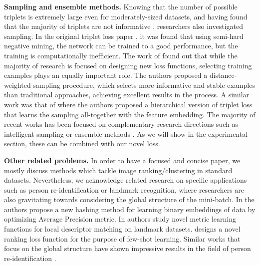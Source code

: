 \documentclass[runningheads]{llncs}
\begin{document}
\noindent\textbf{Sampling and ensemble methods.} Knowing that the number of possible triplets is extremely large even for moderately-sized datasets, and having found that the majority of triplets are not informative \cite{DBLP:conf/cvpr/SchroffKP15}, researchers also investigated sampling. In the original triplet loss paper \cite{DBLP:conf/cvpr/SchroffKP15}, it was found that using semi-hard negative mining, the network can be trained to a good performance, but the training is computationally inefficient. 
The work of \cite{DBLP:conf/iccv/ManmathaWSK17} found out that while the majority of research is focused on designing new loss functions, selecting training examples plays an equally important role. The authors proposed a distance-weighted sampling procedure, which selects more informative and stable examples than traditional approaches, achieving excellent results in the process. A similar work was that of \cite{DBLP:conf/eccv/GeHDS18} where the authors proposed a hierarchical version of triplet loss that learns the sampling all-together with the feature embedding. 
The majority of recent works has been focused on complementary research directions such as intelligent sampling \cite{DBLP:conf/iccv/ManmathaWSK17,DBLP:conf/eccv/GeHDS18,DDBLP:conf/cvpr/Duan2019,DDBLP:conf/cvpr/Wand2019,DDBLP:conf/cvpr/Xu2019} or ensemble methods \cite{DBLP:conf/eccv/XuanSP18,DDBLP:conf/cvpr/Sanakoyeu2019,DBLP:conf/eccv/KimGCLK18,DBLP:conf/iccv/OpitzWPB17,DBLP:conf/iccv/YuanYZ17}. As we will show in the experimental section, these can be combined with our novel loss.

\noindent\textbf{Other related problems.} In order to have a focused and concise paper, we mostly discuss methods which tackle image ranking/clustering in standard datasets. Nevertheless, we acknowledge related research on specific applications such as person re-identification or landmark recognition, where researchers are also gravitating towards considering the global structure of the mini-batch. In \cite{DBLP:conf/cvpr/0003CBS18} the authors propose a new hashing method for learning binary embeddings of data by optimizing Average Precision metric. In \cite{DBLP:journals/corr/abs-1906-07589,DBLP:conf/cvpr/0003LS18} authors study novel metric learning functions for local descriptor matching on landmark datasets. \cite{DBLP:conf/cvpr/Cakir0XKS19} designs a novel ranking loss function for the purpose of few-shot learning. Similar works that focus on the global structure have shown impressive results in the field of person re-identification \cite{DBLP:conf/cvpr/ZhaoXC19,DBLP:journals/corr/abs-1904-11397}.
\end{document}
